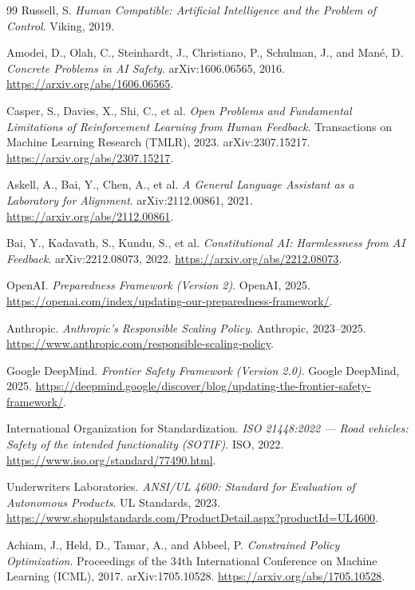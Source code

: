 \documentclass[11pt]{article}
\begin{document}
\begin{thebibliography}{99}
Russell, S. \textit{Human Compatible: Artificial Intelligence and the Problem of Control}. Viking, 2019.

Amodei, D., Olah, C., Steinhardt, J., Christiano, P., Schulman, J., and Man\'e, D. \textit{Concrete Problems in AI Safety}. arXiv:1606.06565, 2016. \url{https://arxiv.org/abs/1606.06565}.

Casper, S., Davies, X., Shi, C., et al. \textit{Open Problems and Fundamental Limitations of Reinforcement Learning from Human Feedback}. Transactions on Machine Learning Research (TMLR), 2023. arXiv:2307.15217. \url{https://arxiv.org/abs/2307.15217}.

Askell, A., Bai, Y., Chen, A., et al. \textit{A General Language Assistant as a Laboratory for Alignment}. arXiv:2112.00861, 2021. \url{https://arxiv.org/abs/2112.00861}.

Bai, Y., Kadavath, S., Kundu, S., et al. \textit{Constitutional AI: Harmlessness from AI Feedback}. arXiv:2212.08073, 2022. \url{https://arxiv.org/abs/2212.08073}.

OpenAI. \textit{Preparedness Framework (Version 2)}. OpenAI, 2025. \url{https://openai.com/index/updating-our-preparedness-framework/}.

Anthropic. \textit{Anthropic's Responsible Scaling Policy}. Anthropic, 2023--2025. \url{https://www.anthropic.com/responsible-scaling-policy}.

Google DeepMind. \textit{Frontier Safety Framework (Version 2.0)}. Google DeepMind, 2025. \url{https://deepmind.google/discover/blog/updating-the-frontier-safety-framework/}.

International Organization for Standardization. \textit{ISO 21448:2022 --- Road vehicles: Safety of the intended functionality (SOTIF)}. ISO, 2022. \url{https://www.iso.org/standard/77490.html}.

Underwriters Laboratories. \textit{ANSI/UL 4600: Standard for Evaluation of Autonomous Products}. UL Standards, 2023. \url{https://www.shopulstandards.com/ProductDetail.aspx?productId=UL4600}.

Achiam, J., Held, D., Tamar, A., and Abbeel, P. \textit{Constrained Policy Optimization}. Proceedings of the 34th International Conference on Machine Learning (ICML), 2017. arXiv:1705.10528. \url{https://arxiv.org/abs/1705.10528}.


\end{thebibliography}
\end{document}
